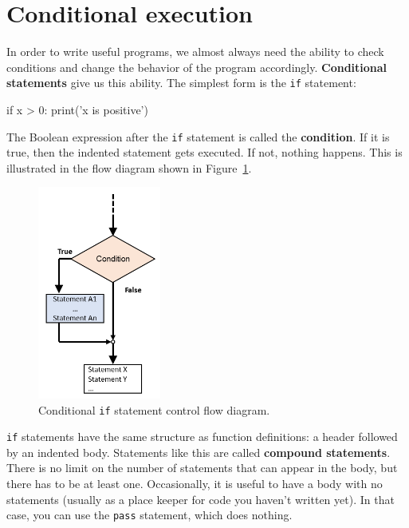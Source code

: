 \section{Conditional execution}
\label{conditional execution}


In order to write useful programs, we almost always need the ability
to check conditions and change the behavior of the program
accordingly.  {\bf Conditional statements} give us this ability.  The
simplest form is the {\tt if} statement:

\beforeverb
\begin{pycode}
if x > 0:
    print('x is positive')
\end{pycode}
\afterverb
%
The Boolean expression after the {\tt if} statement is
called the {\bf condition}.  If it is true, then the indented
statement gets executed.  If not, nothing happens. This is illustrated in the flow diagram shown in Figure~\ref{fig:if-statement}.

\begin{figure}[htb]%
\begin{center}
\includegraphics[height=7cm]{figs/ifstatementdiagram.png}%
\caption{Conditional {\tt if} statement control flow diagram.}%
\label{fig:if-statement}%
\end{center}
\end{figure}


{\tt if} statements have the same structure as function definitions:
a header followed by an indented body.  Statements like this are
called {\bf compound statements}.
%
There is no limit on the number of statements that can appear in
the body, but there has to be at least one.
Occasionally, it is useful to have a body with no statements (usually
as a place keeper for code you haven't written yet).  In that
case, you can use the {\tt pass} statement, which does nothing.

